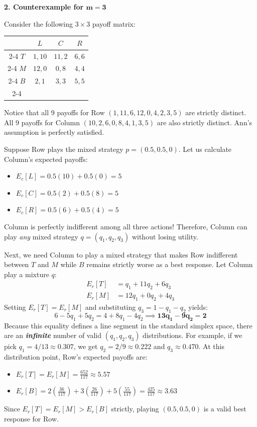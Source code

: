 \documentclass{article}
\begin{document}
\medskip
\noindent\textbf{2. Counterexample for $\mathbf{m=3}$}

Consider the following $3 \times 3$ payoff matrix:

\begin{center}
\begin{tabular}{c|c|c|c|}
\multicolumn{1}{c}{} & \multicolumn{1}{c}{$L$} & \multicolumn{1}{c}{$C$} & \multicolumn{1}{c}{$R$} \\ \cline{2-4}
$T$ & $1, 10$ & $11, 2$ & $6, 6$ \\ \cline{2-4}
$M$ & $12, 0$ & $0, 8$ & $4, 4$ \\ \cline{2-4}
$B$ & $2, 1$ & $3, 3$ & $5, 5$ \\ \cline{2-4}
\end{tabular}
\end{center}

Notice that all 9 payoffs for Row $(1, 11, 6, 12, 0, 4, 2, 3, 5)$ are strictly distinct. All 9 payoffs for Column $(10, 2, 6, 0, 8, 4, 1, 3, 5)$ are also strictly distinct. Ann's assumption is perfectly satisfied.

Suppose Row plays the mixed strategy $p = (0.5, 0.5, 0)$. Let us calculate Column's expected payoffs:
\begin{itemize}
    \item $E_c[L] = 0.5(10) + 0.5(0) = 5$
    \item $E_c[C] = 0.5(2) + 0.5(8) = 5$
    \item $E_c[R] = 0.5(6) + 0.5(4) = 5$
\end{itemize}
Column is perfectly indifferent among all three actions! Therefore, Column can play \emph{any} mixed strategy $q = (q_1, q_2, q_3)$ without losing utility.

Next, we need Column to play a mixed strategy that makes Row indifferent between $T$ and $M$ while $B$ remains strictly worse as a best response. Let Column play a mixture $q$:
\begin{align*}
    E_r[T] &= q_1 + 11q_2 + 6q_3 \\
    E_r[M] &= 12q_1 + 0q_2 + 4q_3 
\end{align*}
Setting $E_r[T] = E_r[M]$ and substituting $q_3 = 1 - q_1 - q_2$ yields:
$$ 6 - 5q_1 + 5q_2 = 4 + 8q_1 - 4q_2 \implies \mathbf{13q_1 - 9q_2 = 2} $$
Because this equality defines a line segment in the standard simplex space, there are an \textbf{\emph{infinite}} number of valid $(q_1, q_2, q_3)$ distributions. For example, if we pick $q_1 = 4/13 \approx 0.307$, we get $q_2 = 2/9 \approx 0.222$ and $q_3 \approx 0.470$. At this distribution point, Row's expected payoffs are:
\begin{itemize}
    \item $E_r[T] = E_r[M] = \frac{652}{117} \approx \mathbf{5.57}$
    \item $E_r[B] = 2(\frac{36}{117}) + 3(\frac{26}{117}) + 5(\frac{55}{117}) = \frac{425}{117} \approx \mathbf{3.63}$
\end{itemize}
Since $E_r[T] = E_r[M] > E_r[B]$ strictly, playing $(0.5, 0.5, 0)$ is a valid best response for Row. 
\end{document}
